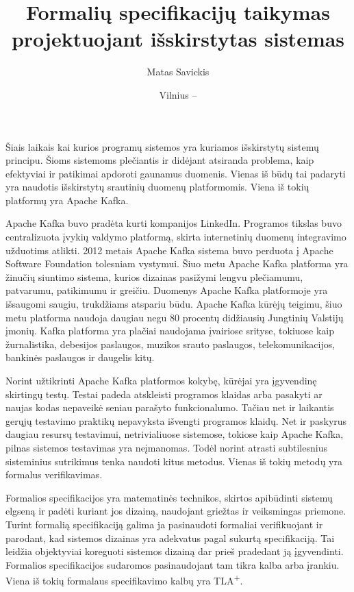 \documentclass{VUMIFPSmagistrinis}
\title{Formalių specifikacijų taikymas projektuojant išskirstytas sistemas}
\author{Matas Savickis}
\date{Vilnius – \the\year}
\begin{document}
\maketitle

\tableofcontents


		Šiais laikais kai kurios programų sistemos yra kuriamos išskirstytų sistemų principu\cite{mcr}.
		Šioms sistemoms plečiantis ir didėjant atsiranda problema, kaip efektyviai ir patikimai apdoroti gaunamus duomenis\cite{bucchiarone2018monolithic}.
		Vienas iš būdų tai padaryti yra naudotis išskirstytų srautinių duomenų platformomis.
		Viena iš tokių platformų yra Apache Kafka\cite{kfk}.


 		Apache Kafka buvo pradėta kurti kompanijos LinkedIn\cite{kfk}. Programos tikslas buvo centralizuota įvykių valdymo platformą, skirta internetinių duomenų integravimo užduotims atlikti.
		2012 metais Apache Kafka sistema buvo perduota į Apache Software Foundation tolesniam vystymui.
		Šiuo metu Apache Kafka platforma yra žinučių siuntimo sistema, kurios dizainas pasižymi lengvu plečiamumu, patvarumu, patikimumu ir greičiu.
		Duomenys Apache Kafka platformoje yra išsaugomi saugiu, trukdžiams atspariu būdu.
		Apache Kafka kūrėjų teigimu, šiuo metu platforma naudoja daugiau negu 80 procentų didžiausių Jungtinių Valstijų įmonių\cite{kfk}.
		Kafka platforma yra plačiai naudojama įvairiose srityse, tokiuose kaip žurnalistika, debesijos paslaugos, muzikos srauto paslaugos, telekomunikacijos, bankinės paslaugos ir daugelis kitų\cite{kfk}.


		Norint užtikrinti Apache Kafka platformos kokybę, kūrėjai yra įgyvendinę skirtingų testų\cite{kfkGH}.
		Testai padeda atskleisti programos klaidas arba pasakyti ar naujas kodas nepaveikė seniau parašyto funkcionalumo\cite{819971}.
		Tačiau net ir laikantis gerųjų testavimo praktikų nepavyksta išvengti programos klaidų.
		Net ir paskyrus daugiau resursų testavimui, netrivialiuose sistemose, tokiose kaip Apache Kafka, pilnas sistemos testavimas yra neįmanomas\cite{sullivan2004software}.
		Todėl norint atrasti subtilesnius sisteminius sutrikimus tenka naudoti kitus metodus.
		Vienas iš tokių metodų yra formalus verifikavimas.


		Formalios specifikacijos yra matematinės technikos, skirtos apibūdinti sistemų elgseną ir padėti kuriant jos dizainą, naudojant griežtas ir veiksmingas priemone\cite{holzmann1995improvement}.
		Turint formalią specifikaciją galima ja pasinaudoti formaliai verifikuojant ir parodant, kad sistemos dizainas yra adekvatus pagal sukurtą specifikaciją.
		Tai leidžia objektyviai koreguoti sistemos dizainą dar prieš pradedant ją įgyvendinti.
		Formalios specifikacijos sudaromos pasinaudojant tam tikra kalba arba įrankiu.
		Viena iš tokių formalaus specifikavimo kalbų yra TLA\textsuperscript{+}.
		
\end{document}
